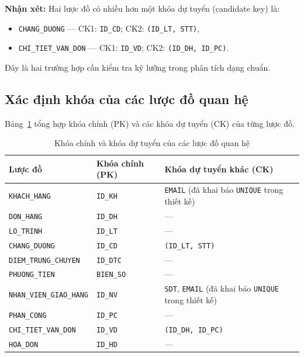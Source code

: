 \documentclass[11pt]{report}
\begin{document}
\textbf{Nhận xét:} Hai lược đồ có nhiều hơn một khóa dự tuyển (candidate key) là:
\begin{itemize}
    \item \texttt{CHANG\_DUONG} --- CK1: \texttt{ID\_CD}; CK2: \texttt{(ID\_LT, STT)},
    
    \item \texttt{CHI\_TIET\_VAN\_DON} --- CK1: \texttt{ID\_VD}; CK2: \texttt{(ID\_DH, ID\_PC)}.
\end{itemize}  
Đây là hai trường hợp cần kiểm tra kỹ lưỡng trong phân tích dạng chuẩn.

\subsection{Xác định khóa của các lược đồ quan hệ}
\label{subsec:xacdinhkhoa}

Bảng~\ref{tab:fkvack} tổng hợp khóa chính (PK) và các khóa dự tuyển (CK) của từng lược đồ.

\begin{table}[H]
    \centering
    \renewcommand{\tabularxcolumn}[1]{m{#1}}
    \begin{tabularx}{\textwidth}{|l|l|X|} \hline
        \rowcolor{teal!30}
        \textbf{Lược đồ} & \textbf{Khóa chính (PK)} & \textbf{Khóa dự tuyển khác (CK)} \\ \hline
        \texttt{KHACH\_HANG}            & \texttt{ID\_KH}   & \texttt{EMAIL} (đã khai báo \texttt{UNIQUE} trong thiết kế) \\ \hline
        \texttt{DON\_HANG}              & \texttt{ID\_DH}   & --- \\ \hline
        \texttt{LO\_TRINH}              & \texttt{ID\_LT}   & --- \\ \hline
        \texttt{CHANG\_DUONG}           & \texttt{ID\_CD}   & \texttt{(ID\_LT, STT)} \\ \hline
        \texttt{DIEM\_TRUNG\_CHUYEN}    & \texttt{ID\_DTC}  & --- \\ \hline
        \texttt{PHUONG\_TIEN}           & \texttt{BIEN\_SO} & --- \\ \hline
        \texttt{NHAN\_VIEN\_GIAO\_HANG} & \texttt{ID\_NV}   & \texttt{SDT}, \texttt{EMAIL} (đã khai báo \texttt{UNIQUE} trong thiết kế) \\ \hline
        \texttt{PHAN\_CONG}             & \texttt{ID\_PC}   & --- \\ \hline
        \texttt{CHI\_TIET\_VAN\_DON}    & \texttt{ID\_VD}   & \texttt{(ID\_DH, ID\_PC)} \\ \hline
        \texttt{HOA\_DON}               & \texttt{ID\_HD}   & --- \\ \hline
    \end{tabularx}
    \caption{Khóa chính và khóa dự tuyển của các lược đồ quan hệ}
    \label{tab:fkvack}
\end{table}
\end{document}
